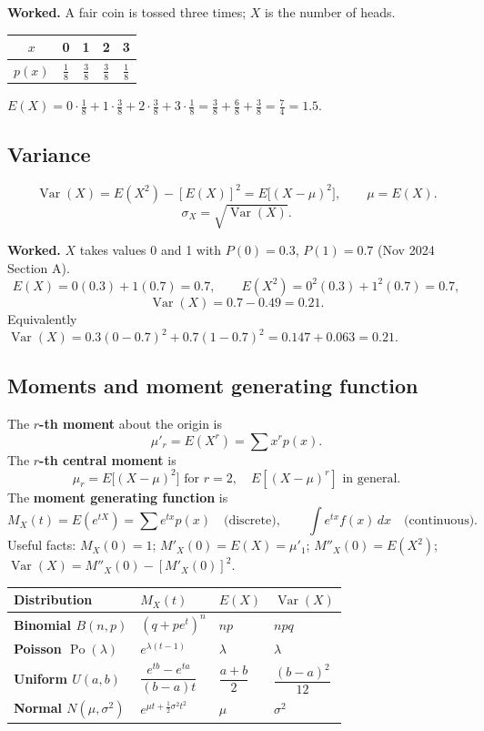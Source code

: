 \documentclass[11pt,a4paper]{article}
\begin{document}
\begin{exambox}
\textbf{Worked.} A fair coin is tossed three times; $X$ is the number of heads.

\begin{center}\small
\begin{tabular}{c|cccc}
\toprule $x$ & 0&1&2&3\\\midrule
$p(x)$ & $\frac18$&$\frac38$&$\frac38$&$\frac18$\\\bottomrule
\end{tabular}
\end{center}

$E(X)=0\cdot\frac18+1\cdot\frac38+2\cdot\frac38+3\cdot\frac18=\frac38+\frac68+\frac38=\frac74=1.5$.
\end{exambox}

\subsection{Variance}
\[
\operatorname{Var}(X)=E(X^2)-[E(X)]^2=E\bigl[(X-\mu)^2\bigr],\qquad \mu=E(X).
\]
\[
\sigma_X=\sqrt{\operatorname{Var}(X)}.
\]

\begin{exambox}
\textbf{Worked.} $X$ takes values 0 and 1 with $P(0)=0.3$, $P(1)=0.7$ (Nov 2024 Section A).
\[
E(X)=0(0.3)+1(0.7)=0.7,\qquad
E(X^2)=0^2(0.3)+1^2(0.7)=0.7,
\]
\[
\operatorname{Var}(X)=0.7-0.49=0.21.
\]
Equivalently $\operatorname{Var}(X)=0.3(0-0.7)^2+0.7(1-0.7)^2=0.147+0.063=0.21$.
\end{exambox}

\subsection{Moments and moment generating function}
The \textbf{$r$-th moment} about the origin is
\[
\mu'_r=E(X^r)=\sum x^r p(x).
\]
The \textbf{$r$-th central moment} is
\[
\mu_r=E\bigl[(X-\mu)^2\bigr]\text{ for }r=2,\quad E[(X-\mu)^r]\text{ in general}.
\]
The \textbf{moment generating function} is
\[
M_X(t)=E(e^{tX})=\sum e^{tx}p(x)\quad\text{(discrete)},\qquad \int e^{tx}f(x)\,dx\quad\text{(continuous)}.
\]
Useful facts: $M_X(0)=1$; $M'_X(0)=E(X)=\mu'_1$; $M''_X(0)=E(X^2)$; $\operatorname{Var}(X)=M''_X(0)-[M'_X(0)]^2$.

\begin{center}\small
\begin{tabularx}{\textwidth}{>{\bfseries}p{} X X X}
\toprule Distribution & $M_X(t)$ & $E(X)$ & $\operatorname{Var}(X)$\\\midrule
Binomial $B(n,p)$ & $(q+pe^t)^n$ & $np$ & $npq$\\
Poisson $\operatorname{Po}(\lambda)$ & $e^{\lambda(t-1)}$ & $\lambda$ & $\lambda$\\
Uniform $U(a,b)$ & $\dfrac{e^{tb}-e^{ta}}{(b-a)t}$ & $\dfrac{a+b}{2}$ & $\dfrac{(b-a)^2}{12}$\\
Normal $N(\mu,\sigma^2)$ & $e^{\mu t+\frac12\sigma^2t^2}$ & $\mu$ & $\sigma^2$\\\bottomrule
\end{tabularx}
\end{center}
\end{document}
